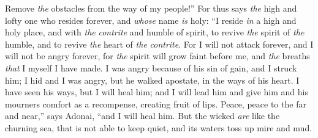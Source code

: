 \begin{biblechapter}
Remove \textit{the} obstacles from the way of my people!”
\verse For thus says \textit{the} high and lofty one who resides forever, and \textit{whose} name \textit{is} holy:
\verse “I reside \textit{in} a high and holy place, 
and with \textit{the} \textit{contrite} and humble of spirit, 
to revive \textit{the} spirit of \textit{the} humble, 
and to revive \textit{the} heart of \textit{the} \textit{contrite}.
\verse For I will not attack forever, 
and I will not be angry forever, 
for \textit{the} spirit will grow faint before me, 
and \textit{the} breaths \textit{that} I myself I have made.
\verse I was angry because of his sin of gain, and I struck him; 
I hid and I was angry, but he walked apostate, in the ways of his heart.
\verse I have seen his ways, but I will heal him; 
and I will lead him and give him and his mourners comfort as a recompense,
\verse creating fruit of lips. 
Peace, peace to the far and near,” says Adonai, “and I will heal him.
\verse But the wicked \textit{are} like the churning sea, 
that is not able to keep quiet, 
and its waters toss up mire and mud.
\end{biblechapter}

